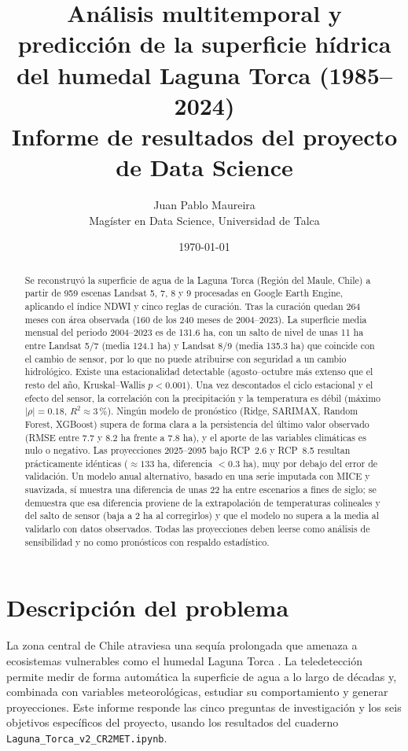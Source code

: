 \documentclass[11pt,a4paper]{article}
\title{Análisis multitemporal y predicción de la superficie hídrica\\del humedal Laguna Torca (1985--2024)\\[2pt]\large Informe de resultados del proyecto de Data Science}
\author{Juan Pablo Maureira\\ Magíster en Data Science, Universidad de Talca}
\date{\today}
\begin{document}
\maketitle

\begin{abstract}
\noindent Se reconstruyó la superficie de agua de la Laguna Torca (Región del Maule, Chile) a partir de 959 escenas Landsat 5, 7, 8 y 9 procesadas en Google Earth Engine, aplicando el índice NDWI y cinco reglas de curación. Tras la curación quedan 264 meses con área observada (160 de los 240 meses de 2004--2023). La superficie media mensual del periodo 2004--2023 es de 131.6 ha, con un salto de nivel de unas 11 ha entre Landsat 5/7 (media 124.1 ha) y Landsat 8/9 (media 135.3 ha) que coincide con el cambio de sensor, por lo que no puede atribuirse con seguridad a un cambio hidrológico. Existe una estacionalidad detectable (agosto--octubre más extenso que el resto del año, Kruskal--Wallis $p<0.001$). Una vez descontados el ciclo estacional y el efecto del sensor, la correlación con la precipitación y la temperatura es débil (máximo $|\rho|=0.18$, $R^2\approx 3\,\%$). Ningún modelo de pronóstico (Ridge, SARIMAX, Random Forest, XGBoost) supera de forma clara a la persistencia del último valor observado (RMSE entre 7.7 y 8.2 ha frente a 7.8 ha), y el aporte de las variables climáticas es nulo o negativo. Las proyecciones 2025--2095 bajo RCP~2.6 y RCP~8.5 resultan prácticamente idénticas (${\approx}133$ ha, diferencia $<0.3$ ha), muy por debajo del error de validación. Un modelo anual alternativo, basado en una serie imputada con MICE y suavizada, sí muestra una diferencia de unas 22 ha entre escenarios a fines de siglo; se demuestra que esa diferencia proviene de la extrapolación de temperaturas colineales y del salto de sensor (baja a 2 ha al corregirlos) y que el modelo no supera a la media al validarlo con datos observados. Todas las proyecciones deben leerse como análisis de sensibilidad y no como pronósticos con respaldo estadístico.
\end{abstract}

\tableofcontents

\section{Descripción del problema}

La zona central de Chile atraviesa una sequía prolongada que amenaza a ecosistemas vulnerables como el humedal Laguna Torca \cite{garreaud2017}. La teledetección permite medir de forma automática la superficie de agua a lo largo de décadas y, combinada con variables meteorológicas, estudiar su comportamiento y generar proyecciones. Este informe responde las cinco preguntas de investigación y los seis objetivos específicos del proyecto, usando los resultados del cuaderno \texttt{Laguna\_Torca\_v2\_CR2MET.ipynb}.
\end{document}
